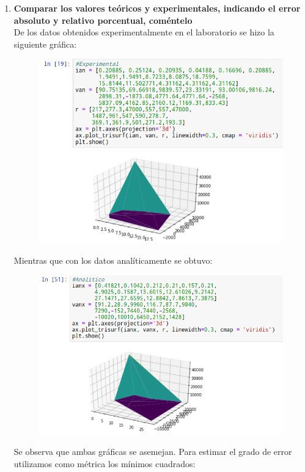 \documentclass[a4paper,12pt]{report}
\begin{document}
\begin{enumerate}
\begin{figure}[H]
\begin{center}
\end{center}
\end{figure}
\newpage
\item \textbf{Comparar los valores teóricos y experimentales, indicando el error absoluto y relativo porcentual, coméntelo}\\
De los datos obtenidos experimentalmente en el laboratorio se hizo la siguiente gráfica:
\begin{figure}[H]
\includegraphics[scale=0.6]{experimentaldata.png}
\end{figure}
Mientras que con los datos analíticamente se obtuvo:
\begin{figure}[H]
\includegraphics[scale=0.6]{analitico2.png}
\end{figure}
Se observa que ambas gráficas se asemejan. Para estimar el grado de error utilizamos como métrica los mínimos cuadrados:

\end{enumerate}
\end{document}
